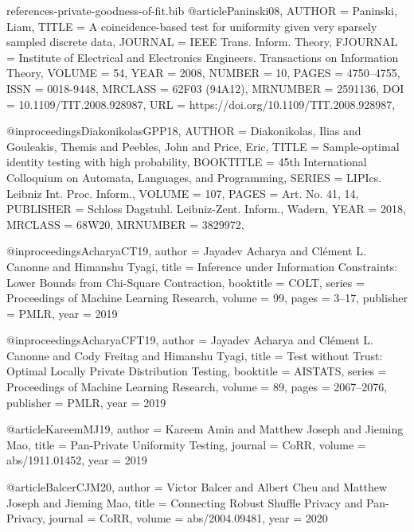 \documentclass[10pt]{article}
\begin{document}
\begin{filecontents}{references-private-goodness-of-fit.bib}
@article{Paninski08,
    AUTHOR = {Paninski, Liam},
     TITLE = {A coincidence-based test for uniformity given very sparsely
              sampled discrete data},
   JOURNAL = {IEEE Trans. Inform. Theory},
  FJOURNAL = {Institute of Electrical and Electronics Engineers.
              Transactions on Information Theory},
    VOLUME = {54},
      YEAR = {2008},
    NUMBER = {10},
     PAGES = {4750--4755},
      ISSN = {0018-9448},
   MRCLASS = {62F03 (94A12)},
  MRNUMBER = {2591136},
       DOI = {10.1109/TIT.2008.928987},
       URL = {https://doi.org/10.1109/TIT.2008.928987},
}

@inproceedings{DiakonikolasGPP18,
    AUTHOR = {Diakonikolas, Ilias and Gouleakis, Themis and Peebles, John
              and Price, Eric},
     TITLE = {Sample-optimal identity testing with high probability},
 BOOKTITLE = {45th {I}nternational {C}olloquium on {A}utomata, {L}anguages,
              and {P}rogramming},
    SERIES = {LIPIcs. Leibniz Int. Proc. Inform.},
    VOLUME = {107},
     PAGES = {Art. No. 41, 14},
 PUBLISHER = {Schloss Dagstuhl. Leibniz-Zent. Inform., Wadern},
      YEAR = {2018},
   MRCLASS = {68W20},
  MRNUMBER = {3829972},
}

@inproceedings{AcharyaCT19,
  author    = {Jayadev Acharya and
               Cl{\'{e}}ment L. Canonne and
               Himanshu Tyagi},
  title     = {Inference under Information Constraints: Lower Bounds from Chi-Square
               Contraction},
  booktitle = {{COLT}},
  series    = {Proceedings of Machine Learning Research},
  volume    = {99},
  pages     = {3--17},
  publisher = {{PMLR}},
  year      = {2019}
}


@inproceedings{AcharyaCFT19,
  author    = {Jayadev Acharya and
               Cl{\'{e}}ment L. Canonne and
               Cody Freitag and
               Himanshu Tyagi},
  title     = {Test without Trust: Optimal Locally Private Distribution Testing},
  booktitle = {{AISTATS}},
  series    = {Proceedings of Machine Learning Research},
  volume    = {89},
  pages     = {2067--2076},
  publisher = {{PMLR}},
  year      = {2019}
}

@article{KareemMJ19,
  author    = {Kareem Amin and
               Matthew Joseph and
               Jieming Mao},
  title     = {Pan-Private Uniformity Testing},
  journal   = {CoRR},
  volume    = {abs/1911.01452},
  year      = {2019}
}

@article{BalcerCJM20,
  author    = {Victor Balcer and
               Albert Cheu and
               Matthew Joseph and
               Jieming Mao},
  title     = {Connecting Robust Shuffle Privacy and Pan-Privacy},
  journal   = {CoRR},
  volume    = {abs/2004.09481},
  year      = {2020}
}


\end{filecontents}
\end{document}
